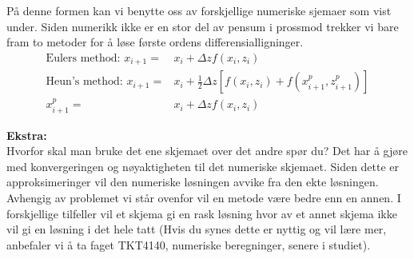 På denne formen kan vi benytte oss av forskjellige numeriske sjemaer som vist under. Siden numerikk ikke er en stor del av pensum i prossmod trekker vi bare fram to metoder for å løse første ordens differensialligninger. 
\begin{align}
    \label{eq:numerical_schemes}
    \text{Eulers method: } x_{i+1} =& x_{i} + \Delta z f(x_i,z_i) \\[0.3cm]
    \text{Heun's method: }x_{i+1} =& x_i + \frac{1}{2}\Delta z[f(x_i,z_i)+f(x_{i+1}^p,z_{i+1}^p)] \\
    x_{i+1}^p =& x_{i} + \Delta z f(x_i,z_i)
\end{align}

\textbf{Ekstra:}\\
Hvorfor skal man bruke det ene skjemaet over det andre spør du? Det har å gjøre med konvergeringen og nøyaktigheten til det numeriske skjemaet. Siden dette er approksimeringer vil den numeriske løsningen avvike fra den ekte løsningen. Avhengig av problemet vi står ovenfor vil en metode være bedre enn en annen. I forskjellige tilfeller vil et skjema gi en rask løsning hvor av et annet skjema ikke vil gi en løsning i det hele tatt (Hvis du synes dette er nyttig og vil lære mer, anbefaler vi å ta faget TKT4140, numeriske beregninger, senere i studiet).  


